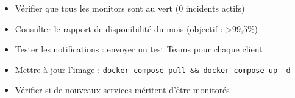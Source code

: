 \documentclass[11pt, a4paper]{article}
\begin{document}
\begin{checklist}
  \begin{itemize}
    \item[$\square$] Vérifier que tous les monitors sont au vert (0 incidents actifs)
    \item[$\square$] Consulter le rapport de disponibilité du mois (objectif : >99,5\%)
    \item[$\square$] Tester les notifications : envoyer un test Teams pour chaque client
    \item[$\square$] Mettre à jour l'image : \texttt{docker compose pull \&\& docker compose up -d}
    \item[$\square$] Vérifier si de nouveaux services méritent d'être monitorés
  \end{itemize}
\end{checklist}
\end{document}
